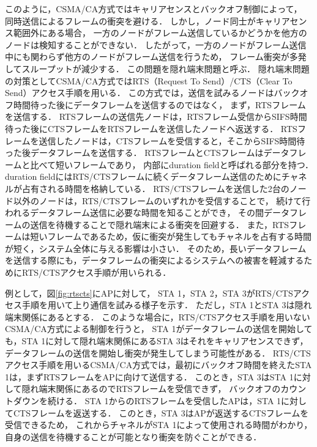 \documentclass[master]{kuisthesis}		%
\begin{document}
			\par
			このように，CSMA/CA方式ではキャリアセンスとバックオフ制御によって，
			同時送信によるフレームの衝突を避ける．
			しかし，ノード同士がキャリアセンス範囲外にある場合，
			一方のノードがフレーム送信しているかどうかを他方のノードは検知することができない．
			したがって，一方のノードがフレーム送信中にも関わらず他方のノードがフレーム送信を行うため，
			フレーム衝突が多発してスループットが減少する．
			この問題を隠れ端末問題と呼ぶ．
			隠れ端末問題の対策としてCSMA/CA方式ではRTS（Request To Send）/CTS（Clear To Send）アクセス手順を用いる．
			この方式では，送信を試みるノードはバックオフ時間待った後にデータフレームを送信するのではなく，
			まず，RTSフレームを送信する．
			RTSフレームの送信先ノードは，RTSフレーム受信からSIFS時間待った後にCTSフレームをRTSフレームを送信したノードへ返送する．
			RTSフレームを送信したノードは，CTSフレームを受信すると，そこからSIFS時間待った後データフレームを送信する．
			RTSフレームとCTSフレームはデータフレームと比べて短いフレームであり，
			内部にduration fieldと呼ばれる部分を持つ．
			duration fieldにはRTS/CTSフレームに続くデータフレーム送信のためにチャネルが占有される時間を格納している．
			RTS/CTSフレームを送信した2台のノード以外のノードは，RTS/CTSフレームのいずれかを受信することで，
			続けて行われるデータフレーム送信に必要な時間を知ることができ，
			その間データフレームの送信を待機することで隠れ端末による衝突を回避する．
			また，RTSフレームは短いフレームであるため，仮に衝突が発生してもチャネルを占有する時間が短く，システム全体に与える影響は小さい．
			そのため，長いデータフレームを送信する際にも，データフレームの衝突によるシステムへの被害を軽減するためにRTS/CTSアクセス手順が用いられる．


			\par
			例として，図\ref{fig:rtscts}にAPに対して，
			STA 1，STA 2，STA 3がRTS/CTSアクセス手順を用いて上り通信を試みる様子を示す．
			ただし，STA 1とSTA 3は隠れ端末関係にあるとする．
			このような場合に，RTS/CTSアクセス手順を用いないCSMA/CA方式による制御を行うと，
			STA 1がデータフレームの送信を開始しても，STA 1に対して隠れ端末関係にあるSTA 3はそれをキャリアセンスできず，
			データフレームの送信を開始し衝突が発生してしまう可能性がある．
			RTS/CTSアクセス手順を用いるCSMA/CA方式では，最初にバックオフ時間を終えたSTA 1は，まずRTSフレームをAPに向けて送信する．
			このとき，STA 3はSTA 1に対して隠れ端末関係にあるのでRTSフレームを受信できず，
			バックオフのカウントダウンを続ける．
			STA 1からのRTSフレームを受信したAPは，STA 1に対してCTSフレームを返送する．
			このとき，STA 3はAPが返送するCTSフレームを受信できるため，
			これからチャネルがSTA 1によって使用される時間がわかり，自身の送信を待機することが可能となり衝突を防ぐことができる．
\end{document}
